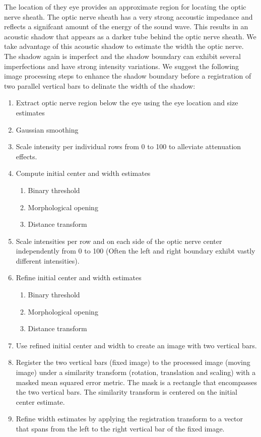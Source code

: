 \documentclass{llncs}
\begin{document}
The location of they eye provides an approximate region for locating the optic
nerve sheath. The optic nerve sheath has a very strong accoustic impedance and
reflects a signifcant amount of the energy of the sound wave. This results in an
acoustic shadow that appears as a darker tube behind the optic nerve sheath.
We take advantage of this acoustic shadow to estimate the width the optic nerve.
The shadow again is imperfect and the shadow boundary can exhibit several
imperfections and have strong intensity variations. We suggest the following
image processing steps to enhance the shadow boundary before a registration of
two parallel vertical bars to delinate the width of the shadow:
\begin{enumerate}
\item Extract optic nerve region below the eye using the eye location and size estimates
\item Gaussian smoothing
\item Scale intensity per individual rows from 0 to 100 to alleviate attenuation
      effects.
\item Compute initial center and width estimates
  \begin{enumerate}
  \item Binary threshold
  \item Morphological opening
  \item Distance transform
  \end{enumerate}
\item Scale intensities per row and on each side of the optic nerve center
      independently from 0 to 100 (Often the left and right boundary exhibt
      vastly different intensities). 
\item Refine initial center and width estimates
  \begin{enumerate}
  \item Binary threshold
  \item Morphological opening
  \item Distance transform
  \end{enumerate}
\item Use refined initial center and width to create an image with two vertical bars. 
\item Register the two vertical bars (fixed image) to the processed image (moving
      image) under a similarity transform (rotation, translation and scaling)
      with a masked mean squared error metric. The mask is a rectangle that
      encompasses the two vertical bars. The similarity transform is centered on
      the initial  center estimate.
\item Refine width estimates by applying the registration transform to a vector
      that spans from the left to the right vertical bar of the fixed image.
\end{enumerate}
\end{document}
